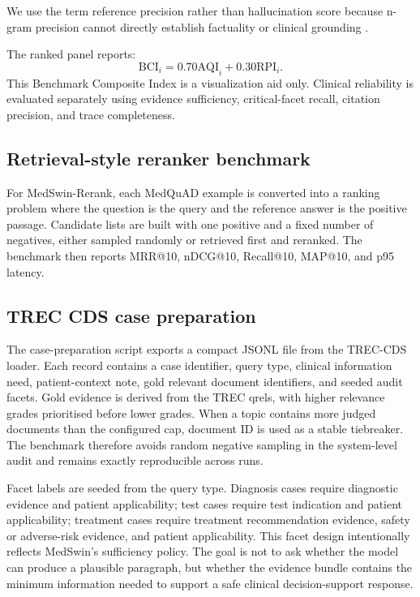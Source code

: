 \documentclass[conference]{IEEEtran}
\begin{document}
We use the term reference precision rather than hallucination score because n-gram precision cannot directly establish factuality or clinical grounding \cite{maynez-etal-2020-faithfulness,ji2023hallucination}.

The ranked panel reports:
\[
\mathrm{BCI}_i
=
0.70 \mathrm{AQI}_i
+
0.30 \mathrm{RPI}_i.
\]
This Benchmark Composite Index is a visualization aid only. Clinical reliability is evaluated separately using evidence sufficiency, critical-facet recall, citation precision, and trace completeness.


\subsection{Retrieval-style reranker benchmark}
For MedSwin-Rerank, each MedQuAD example is converted into a ranking problem where the question is the query and the reference answer is the positive passage. Candidate lists are built with one positive and a fixed number of negatives, either sampled randomly or retrieved first and reranked. The benchmark then reports MRR@10, nDCG@10, Recall@10, MAP@10, and p95 latency.


\subsection{TREC CDS case preparation}
The case-preparation script exports a compact JSONL file from the TREC-CDS loader. Each record contains a case identifier, query type, clinical information need, patient-context note, gold relevant document identifiers, and seeded audit facets. Gold evidence is derived from the TREC qrels, with higher relevance grades prioritised before lower grades. When a topic contains more judged documents than the configured cap, document ID is used as a stable tiebreaker. The benchmark therefore avoids random negative sampling in the system-level audit and remains exactly reproducible across runs.

Facet labels are seeded from the query type. Diagnosis cases require diagnostic evidence and patient applicability; test cases require test indication and patient applicability; treatment cases require treatment recommendation evidence, safety or adverse-risk evidence, and patient applicability. This facet design intentionally reflects MedSwin's sufficiency policy. The goal is not to ask whether the model can produce a plausible paragraph, but whether the evidence bundle contains the minimum information needed to support a safe clinical decision-support response.
\end{document}
